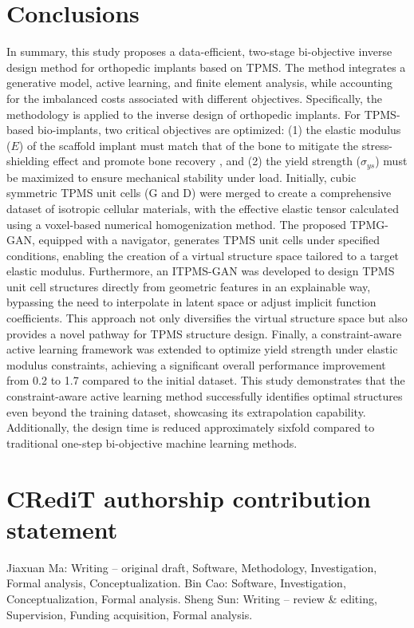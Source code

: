 \documentclass[preprint,review,12pt,authoryear]{elsarticle}
\begin{document}
\section{Conclusions}

In summary, this study proposes a data-efficient, two-stage bi-objective inverse design method for orthopedic implants based on TPMS. The method integrates a generative model, active learning, and finite element analysis, while accounting for the imbalanced costs associated with different objectives. Specifically, the methodology is applied to the inverse design of orthopedic implants. For TPMS-based bio-implants, two critical objectives are optimized: (1) the elastic modulus ($E$) of the scaffold implant must match that of the bone to mitigate the stress-shielding effect and promote bone recovery , and (2) the yield strength ($\sigma_{ys}$) must be maximized to ensure mechanical stability under load. Initially, cubic symmetric TPMS unit cells (G and D) were merged to create a comprehensive dataset of isotropic cellular materials, with the effective elastic tensor calculated using a voxel-based numerical homogenization method. The proposed TPMG-GAN, equipped with a navigator, generates TPMS unit cells under specified conditions, enabling the creation of a virtual structure space tailored to a target elastic modulus. Furthermore, an ITPMS-GAN was developed to design TPMS unit cell structures directly from geometric features in an explainable way, bypassing the need to interpolate in latent space or adjust implicit function coefficients. This approach not only diversifies the virtual structure space but also provides a novel pathway for TPMS structure design. Finally, a constraint-aware active learning framework was extended to optimize yield strength under elastic modulus constraints, achieving a significant overall performance improvement from 0.2 to 1.7 compared to the initial dataset. This study demonstrates that the constraint-aware active learning method successfully identifies optimal structures even beyond the training dataset, showcasing its extrapolation capability. Additionally, the design time is reduced approximately sixfold compared to traditional one-step bi-objective machine learning methods.


\section*{CRediT authorship contribution statement}
Jiaxuan Ma: Writing – original draft, Software, Methodology, Investigation, Formal analysis, Conceptualization. Bin Cao: Software, Investigation, Conceptualization, Formal analysis. Sheng Sun: Writing – review \& editing, Supervision, Funding acquisition, Formal analysis.
\end{document}
